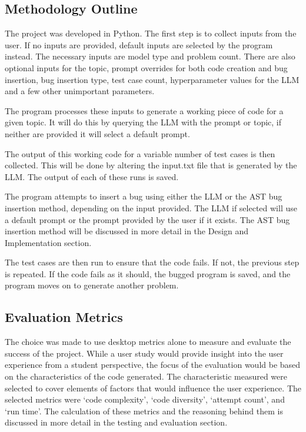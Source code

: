 \documentclass[12pt]{extarticle}
\begin{document}
\subsection{Methodology Outline}

The project was developed in Python. The first step is to collect inputs from the user. If no inputs are provided, default inputs are selected by the program instead. The necessary inputs are model type and problem count. There are also optional inputs for the topic, prompt overrides for both code creation and bug insertion, bug insertion type, test case count, hyperparameter values for the LLM and a few other unimportant parameters.

The program processes these inputs to generate a working piece of code for a given topic. It will do this by querying the LLM with the prompt or topic, if neither are provided it will select a default prompt.

The output of this working code for a variable number of test cases is then collected. This will be done by altering the input.txt file that is generated by the LLM. The output of each of these runs is saved.

The program attempts to insert a bug using either the LLM or the AST bug insertion method, depending on the input provided. The LLM if selected will use a default prompt or the prompt provided by the user if it exists. The AST bug insertion method will be discussed in more detail in the Design and Implementation section.

The test cases are then run to ensure that the code fails. If not, the previous step is repeated. If the code fails as it should, the bugged program is saved, and the program moves on to generate another problem.

\subsection{Evaluation Metrics}

The choice was made to use desktop metrics alone to measure and evaluate the success of the project. While a user study would provide insight into the user experience from a student perspective, the focus of the evaluation would be based on the characteristics of the code generated. The characteristic measured were selected to cover elements of factors that would influence the user experience. The selected metrics were `code complexity', `code diversity', `attempt count', and `run time'. The calculation of these metrics and the reasoning behind them is discussed in more detail in the testing and evaluation section.
\end{document}
